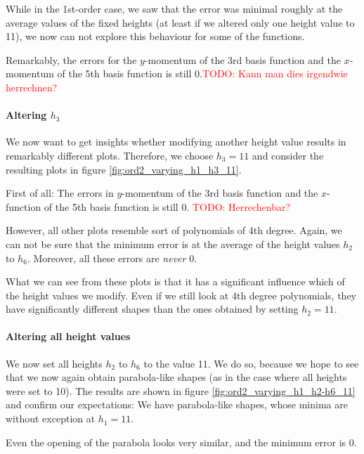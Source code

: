 \documentclass{article}
\newcommand{\todo}[1]{\textcolor{red}{TODO: #1}}
\begin{document}
While in the 1st-order case, we saw that the error was minimal roughly at the average values of the fixed heights (at least if we altered only one height value to 11), we now can not explore this behaviour for some of the functions.

Remarkably, the errors for the $y$-momentum of the 3rd basis function and the $x$-momentum of the 5th basis function is still 0.\todo{Kann man dies irgendwie herrechnen?}

\paragraph{Altering $h_3$}

We now want to get insights whether modifying another height value results in remarkably different plots. Therefore, we choose $h_3=11$ and consider the resulting plots in figure \ref{fig:ord2_varying_h1_h3_11}.



First of all: The errors in $y$-momentum of the 3rd basis function and the $x$-function of the 5th basis function is still 0. \todo{Herrechenbar?} 

However, all other plots resemble sort of polynomials of 4th degree. Again, we can not be sure that the minimum error is at the average of the height values $h_2$ to $h_6$. Moreover, all these errors are \emph{never} 0.

What we can see from these plots is that it has a significant influence which of the height values we modify. Even if we still look at 4th degree polynomials, they have significantly different shapes than the ones obtained by setting $h_2=11$.

\paragraph{Altering all height values}

We now set all heights $h_2$ to $h_6$ to the value 11. We do so, because we hope to see that we now again obtain parabola-like shapes (as in the case where all heights were set to 10). The results are shown in figure \ref{fig:ord2_varying_h1_h2-h6_11} and confirm our expectations: We have parabola-like shapes, whose minima are without exception at $h_1=11$.



Even the opening of the parabola looks very similar, and the minimum error is 0.
\end{document}

